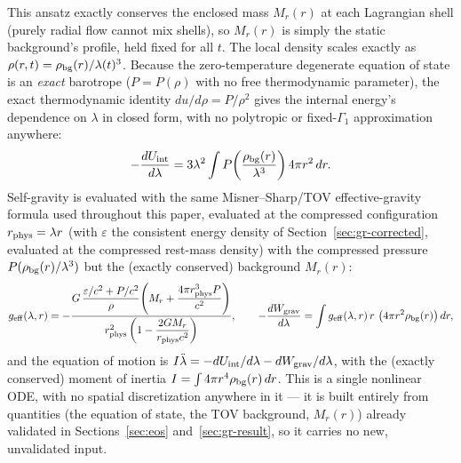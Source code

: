 \documentclass[11pt]{article}
\begin{document}
This ansatz exactly conserves the enclosed mass $M_r(r)$ at each Lagrangian shell (purely radial flow cannot mix shells), so $M_r(r)$ is simply the static background's profile, held fixed for all $t$. The local density scales exactly as $\rho(r,t)=\rho_{\rm bg}(r)/\lambda(t)^3$. Because the zero-temperature degenerate equation of state is an \emph{exact} barotrope ($P=P(\rho)$ with no free thermodynamic parameter), the exact thermodynamic identity $du/d\rho=P/\rho^2$ gives the internal energy's dependence on $\lambda$ in closed form, with no polytropic or fixed-$\Gamma_1$ approximation anywhere:
\begin{equation}
-\frac{dU_{\rm int}}{d\lambda}=3\lambda^2\int P\!\left(\frac{\rho_{\rm bg}(r)}{\lambda^3}\right)4\pi r^2\,dr .
\label{eq:dUint}
\end{equation}
Self-gravity is evaluated with the same Misner--Sharp/TOV effective-gravity formula \citep{MisnerSharp1964} used throughout this paper, evaluated at the compressed configuration $r_{\rm phys}=\lambda r$ (with $\varepsilon$ the consistent energy density of Section~\ref{sec:gr-corrected}, evaluated at the compressed rest-mass density) with the compressed pressure $P(\rho_{\rm bg}(r)/\lambda^3)$ but the (exactly conserved) background $M_r(r)$:
\begin{equation}
g_{\rm eff}(\lambda,r)=-\frac{G\,\dfrac{\varepsilon/c^2+P/c^2}{\rho}\!\left(M_r+\dfrac{4\pi r_{\rm phys}^3 P}{c^2}\right)}{r_{\rm phys}^2\left(1-\dfrac{2GM_r}{r_{\rm phys}c^2}\right)},\qquad
-\frac{dW_{\rm grav}}{d\lambda}=\int g_{\rm eff}(\lambda,r)\,r\,\left(4\pi r^2\rho_{\rm bg}(r)\right)dr ,
\label{eq:dWgrav}
\end{equation}
and the equation of motion is $I\ddot\lambda=-dU_{\rm int}/d\lambda-dW_{\rm grav}/d\lambda$, with the (exactly conserved) moment of inertia $I=\int4\pi r^4\rho_{\rm bg}(r)\,dr$. This is a single nonlinear ODE, with no spatial discretization anywhere in it --- it is built entirely from quantities (the equation of state, the TOV background, $M_r(r)$) already validated in Sections~\ref{sec:eos} and~\ref{sec:gr-result}, so it carries no new, unvalidated input.
\end{document}
